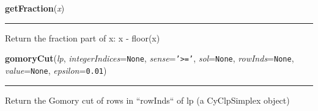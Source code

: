     \label{coinor:cuppy:cuttingPlanes:getFraction}

    \vspace{0.5ex}

\hspace{.8\funcindent}\begin{boxedminipage}{\funcwidth}

    \raggedright \textbf{getFraction}(\textit{x})

    \vspace{-1.5ex}

    \rule{\textwidth}{0.5\fboxrule}
\setlength{\parskip}{2ex}
    Return the fraction part of x: x - floor(x)

\setlength{\parskip}{1ex}
    \end{boxedminipage}

    \label{coinor:cuppy:cuttingPlanes:gomoryCut}

    \vspace{0.5ex}

\hspace{.8\funcindent}\begin{boxedminipage}{\funcwidth}

    \raggedright \textbf{gomoryCut}(\textit{lp}, \textit{integerIndices}={\tt None}, \textit{sense}={\tt \texttt{'}\texttt{{\textgreater}=}\texttt{'}}, \textit{sol}={\tt None}, \textit{rowInds}={\tt None}, \textit{value}={\tt None}, \textit{epsilon}={\tt 0.01})

    \vspace{-1.5ex}

    \rule{\textwidth}{0.5\fboxrule}
\setlength{\parskip}{2ex}
    Return the Gomory cut of rows in ``rowInds`` of lp (a CyClpSimplex 
    object)

\setlength{\parskip}{1ex}
    \end{boxedminipage}

    \label{coinor:cuppy:cuttingPlanes:disp_relaxation}

    \vspace{0.5ex}

